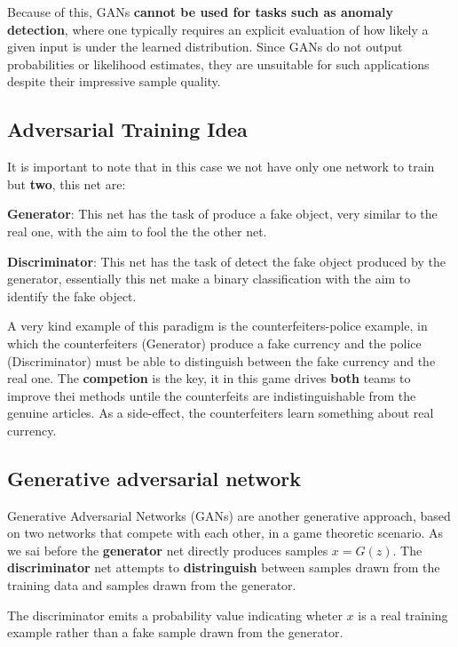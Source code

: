 Because of this, GANs \textbf{cannot be used for tasks such as anomaly detection}, where one typically requires an explicit evaluation of how likely a given input is under the learned distribution. Since GANs do not output probabilities or likelihood estimates, they are unsuitable for such applications despite their impressive sample quality.

\subsection{Adversarial Training Idea}
It is important to note that in this case we not have only one network to train but \textbf{two}, this net are:
\begin{compactitemize}
    \item \textbf{Generator}: This net has the task of produce a fake object, very similar to the real one, with the aim to fool the the other net.
    \item \textbf{Discriminator}: This net has the task of detect the fake object produced by the generator, essentially this net make a binary classification with the aim to identify the fake object.
\end{compactitemize}
A very kind example of this paradigm is the counterfeiters-police example, in which the counterfeiters (Generator) produce a fake currency and the police (Discriminator) must  be able to distinguish between the fake currency and the real one.
The \textbf{competion} is the key, it in this game drives \textbf{both} teams to improve thei methods untile the counterfeits are indistinguishable from the genuine articles.
As a side-effect, the counterfeiters learn something about real currency.

\subsection{Generative adversarial network}
Generative Adversarial Networks (GANs) are another generative approach, based on two networks that compete with each other, in a game theoretic scenario.
As we sai before the \textbf{generator} net directly produces samples $x=G(z)$.
The \textbf{discriminator} net attempts to \textbf{distringuish} between samples drawn from the training data and samples drawn from the generator.

The discriminator emits a probability value indicating wheter $x$ is a real training example rather than a fake sample drawn from the generator.

